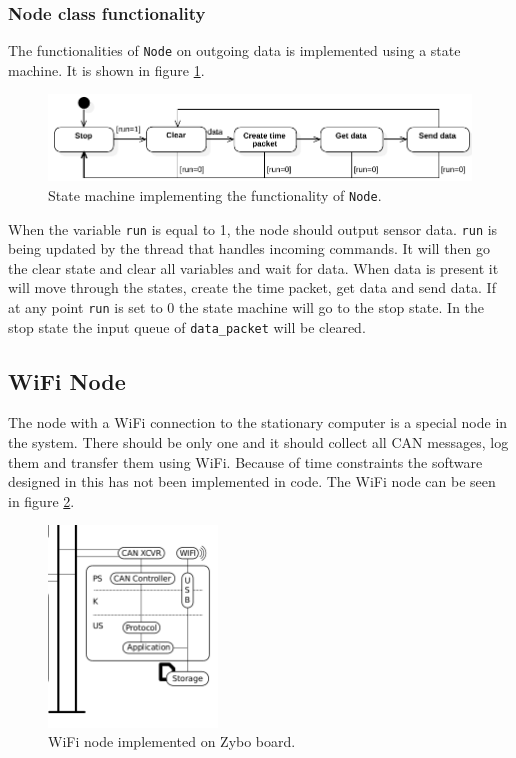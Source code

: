 \subsubsection*{Node class functionality}
The functionalities of \texttt{Node} on outgoing data is implemented using a state machine.
It is shown in figure \ref{fig:state_machine}.
\begin{figure}[!h]
\centering
\includegraphics[width=1\textwidth]{graphics/StateDiagram_Node.pdf}
\caption{State machine implementing the functionality of \texttt{Node}. }
\label{fig:state_machine}
\end{figure}
When the variable \texttt{run} is equal to 1, the node should output sensor data.
\texttt{run} is being updated by the thread that handles incoming commands.
It will then go the clear state and clear all variables and wait for data. 
When data is present it will move through the states, create the time packet, get data and send data. 
If at any point \texttt{run} is set to 0 the state machine will go to the stop state.
In the stop state the input queue of \texttt{data\_packet} will be cleared.


\subsection{WiFi Node}
The node with a WiFi connection to the stationary computer is a special node in the system.
There should be only one and it should collect all CAN messages, log them and transfer them using WiFi.
Because of time constraints the software designed in this has not been implemented in code.
The WiFi node can be seen in figure \ref{fig:wifi_node}.

\begin{figure}[!h]
\centering
\includegraphics[width=0.4\textwidth]{graphics/wifi_node}
\caption{WiFi node implemented on Zybo board.}
\label{fig:wifi_node}
\end{figure}


